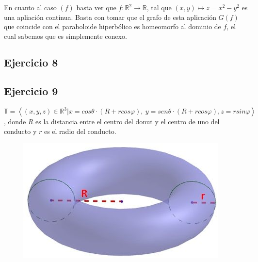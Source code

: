 \documentclass{article}
\begin{document}
En cuanto al caso $(f)$ basta ver que $f:\mathbb{R}^2\rightarrow \mathbb{R}$, tal que $(x,y)\mapsto z=x^2-y^2$ es una apliación continua. Basta con tomar que el grafo de esta aplicación $G(f)$ que coincide con el paraboloide hiperbólico es homeomorfo al dominio de $f$, el cual sabemos que es simplemente conexo.

\subsection{Ejercicio 8}

\subsection{Ejercicio 9}
$\mathbb{T}=\left\langle (x,y,z)\in \mathbb{R}^3| x=cos\theta\cdot(R+rcos\varphi),\:y=sen\theta\cdot(R+rcos\varphi), z=rsin\varphi\right\rangle$, donde $R$ es la distancia entre el centro del donut y el centro de uno del conducto y $r$ es el radio del conducto.
\begin{figure}[h]
\centering
\includegraphics[scale=0.5,width=\textwidth]{toro-volumen.jpg}
\end{figure}
\end{document}
